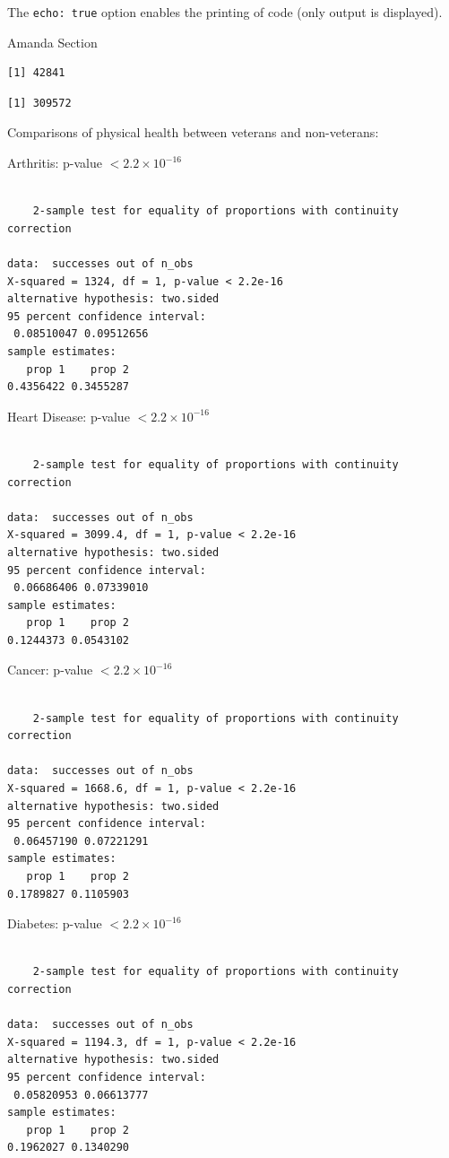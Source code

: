 \documentclass[
  10pt,
  letterpaper,
  DIV=11,
  numbers=noendperiod]{scrartcl}
\begin{document}
The \texttt{echo:\ true} option enables the printing of code (only
output is displayed).

Amanda Section

\begin{verbatim}
[1] 42841
\end{verbatim}

\begin{verbatim}
[1] 309572
\end{verbatim}

Comparisons of physical health between veterans and non-veterans:

Arthritis: p-value \(< 2.2 \times 10^{-16}\)

\begin{verbatim}

    2-sample test for equality of proportions with continuity correction

data:  successes out of n_obs
X-squared = 1324, df = 1, p-value < 2.2e-16
alternative hypothesis: two.sided
95 percent confidence interval:
 0.08510047 0.09512656
sample estimates:
   prop 1    prop 2 
0.4356422 0.3455287 
\end{verbatim}

Heart Disease: p-value \(< 2.2 \times 10^{-16}\)

\begin{verbatim}

    2-sample test for equality of proportions with continuity correction

data:  successes out of n_obs
X-squared = 3099.4, df = 1, p-value < 2.2e-16
alternative hypothesis: two.sided
95 percent confidence interval:
 0.06686406 0.07339010
sample estimates:
   prop 1    prop 2 
0.1244373 0.0543102 
\end{verbatim}

Cancer: p-value \(< 2.2 \times 10^{-16}\)

\begin{verbatim}

    2-sample test for equality of proportions with continuity correction

data:  successes out of n_obs
X-squared = 1668.6, df = 1, p-value < 2.2e-16
alternative hypothesis: two.sided
95 percent confidence interval:
 0.06457190 0.07221291
sample estimates:
   prop 1    prop 2 
0.1789827 0.1105903 
\end{verbatim}

Diabetes: p-value \(< 2.2 \times 10^{-16}\)

\begin{verbatim}

    2-sample test for equality of proportions with continuity correction

data:  successes out of n_obs
X-squared = 1194.3, df = 1, p-value < 2.2e-16
alternative hypothesis: two.sided
95 percent confidence interval:
 0.05820953 0.06613777
sample estimates:
   prop 1    prop 2 
0.1962027 0.1340290 
\end{verbatim}
\end{document}
